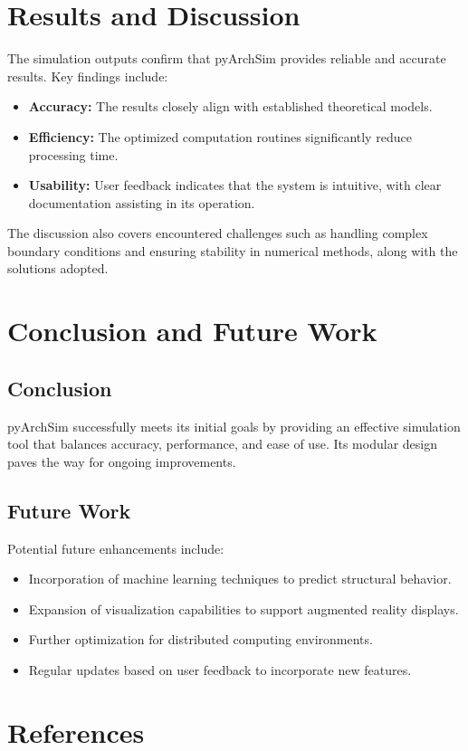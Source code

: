\documentclass[12pt,a4paper]{report}
\begin{document}
\section{Results and Discussion}
The simulation outputs confirm that pyArchSim provides reliable and accurate results. Key findings include:
\begin{itemize}
  \item \textbf{Accuracy:} The results closely align with established theoretical models.
  \item \textbf{Efficiency:} The optimized computation routines significantly reduce processing time.
  \item \textbf{Usability:} User feedback indicates that the system is intuitive, with clear documentation assisting in its operation.
\end{itemize}

The discussion also covers encountered challenges such as handling complex boundary conditions and ensuring stability in numerical methods, along with the solutions adopted.

\section{Conclusion and Future Work}
\subsection{Conclusion}
pyArchSim successfully meets its initial goals by providing an effective simulation tool that balances accuracy, performance, and ease of use. Its modular design paves the way for ongoing improvements.

\subsection{Future Work}
Potential future enhancements include:
\begin{itemize}
  \item Incorporation of machine learning techniques to predict structural behavior.
  \item Expansion of visualization capabilities to support augmented reality displays.
  \item Further optimization for distributed computing environments.
  \item Regular updates based on user feedback to incorporate new features.
\end{itemize}

\section{References}
\end{document}
